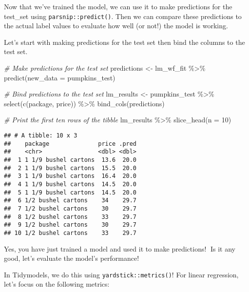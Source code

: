 \documentclass[
]{article}
\newenvironment{Shaded}{\begin{snugshade}}{\end{snugshade}}
\newcommand{\AttributeTok}[1]{\textcolor[rgb]{0.77,0.63,0.00}{#1}}
\newcommand{\CommentTok}[1]{\textcolor[rgb]{0.56,0.35,0.01}{\textit{#1}}}
\newcommand{\DecValTok}[1]{\textcolor[rgb]{0.00,0.00,0.81}{#1}}
\newcommand{\FunctionTok}[1]{\textcolor[rgb]{0.00,0.00,0.00}{#1}}
\newcommand{\NormalTok}[1]{#1}
\newcommand{\OtherTok}[1]{\textcolor[rgb]{0.56,0.35,0.01}{#1}}
\newcommand{\SpecialCharTok}[1]{\textcolor[rgb]{0.00,0.00,0.00}{#1}}
\begin{document}
Now that we've trained the model, we can use it to make predictions for
the test\_set using \texttt{parsnip::predict()}. Then we can compare
these predictions to the actual label values to evaluate how well (or
not!) the model is working.

Let's start with making predictions for the test set then bind the
columns to the test set.

\begin{Shaded}
\begin{Highlighting}[]
\CommentTok{\# Make predictions for the test set}
\NormalTok{predictions }\OtherTok{\textless{}{-}}\NormalTok{ lm\_wf\_fit }\SpecialCharTok{\%\textgreater{}\%} 
  \FunctionTok{predict}\NormalTok{(}\AttributeTok{new\_data =}\NormalTok{ pumpkins\_test)}


\CommentTok{\# Bind predictions to the test set}
\NormalTok{lm\_results }\OtherTok{\textless{}{-}}\NormalTok{ pumpkins\_test }\SpecialCharTok{\%\textgreater{}\%} 
  \FunctionTok{select}\NormalTok{(}\FunctionTok{c}\NormalTok{(package, price)) }\SpecialCharTok{\%\textgreater{}\%} 
  \FunctionTok{bind\_cols}\NormalTok{(predictions)}


\CommentTok{\# Print the first ten rows of the tibble}
\NormalTok{lm\_results }\SpecialCharTok{\%\textgreater{}\%} 
  \FunctionTok{slice\_head}\NormalTok{(}\AttributeTok{n =} \DecValTok{10}\NormalTok{)}
\end{Highlighting}
\end{Shaded}

\begin{verbatim}
## # A tibble: 10 x 3
##    package              price .pred
##    <chr>                <dbl> <dbl>
##  1 1 1/9 bushel cartons  13.6  20.0
##  2 1 1/9 bushel cartons  15.5  20.0
##  3 1 1/9 bushel cartons  16.4  20.0
##  4 1 1/9 bushel cartons  14.5  20.0
##  5 1 1/9 bushel cartons  14.5  20.0
##  6 1/2 bushel cartons    34    29.7
##  7 1/2 bushel cartons    30    29.7
##  8 1/2 bushel cartons    33    29.7
##  9 1/2 bushel cartons    30    29.7
## 10 1/2 bushel cartons    33    29.7
\end{verbatim}

Yes, you have just trained a model and used it to make predictions!🔮 Is
it any good, let's evaluate the model's performance!

In Tidymodels, we do this using \texttt{yardstick::metrics()}! For
linear regression, let's focus on the following metrics:
\end{document}
